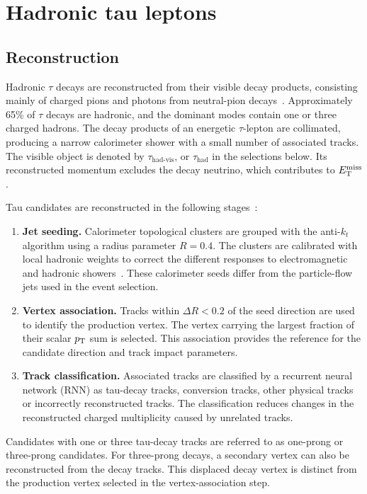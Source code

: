 \section{Hadronic tau leptons}
\label{sec:ch6_tau}

\subsection{Reconstruction}

Hadronic $\tau$ decays are reconstructed from their visible decay products, consisting mainly of charged pions and photons from neutral-pion decays~\cite{ATLAS2022TauR22}.
Approximately 65\% of $\tau$ decays are hadronic, and the dominant modes contain one or three charged hadrons.
The decay products of an energetic $\tau$-lepton are collimated, producing a narrow calorimeter shower with a small number of associated tracks.
The visible object is denoted by $\tau_{\mathrm{had\text{-}vis}}$, or $\tau_{\mathrm{had}}$ in the selections below.
Its reconstructed momentum excludes the decay neutrino, which contributes to $E_{\mathrm{T}}^{\mathrm{miss}}$.

Tau candidates are reconstructed in the following stages~\cite{ATLAS2022TauR22}:
\begin{enumerate}
    \item \textbf{Jet seeding.} Calorimeter topological clusters are grouped with the anti-$k_t$ algorithm using a radius parameter $R=0.4$. The clusters are calibrated with local hadronic weights to correct the different responses to electromagnetic and hadronic showers~\cite{ATLAS2017TopoClusters}. These calorimeter seeds differ from the particle-flow jets used in the event selection.
    \item \textbf{Vertex association.} Tracks within $\Delta R<0.2$ of the seed direction are used to identify the production vertex. The vertex carrying the largest fraction of their scalar $p_{\mathrm{T}}$ sum is selected. This association provides the reference for the candidate direction and track impact parameters.
    \item \textbf{Track classification.} Associated tracks are classified by a recurrent neural network (RNN) as tau-decay tracks, conversion tracks, other physical tracks or incorrectly reconstructed tracks. The classification reduces changes in the reconstructed charged multiplicity caused by unrelated tracks.
\end{enumerate}
Candidates with one or three tau-decay tracks are referred to as one-prong or three-prong candidates.
For three-prong decays, a secondary vertex can also be reconstructed from the decay tracks.
This displaced decay vertex is distinct from the production vertex selected in the vertex-association step.


